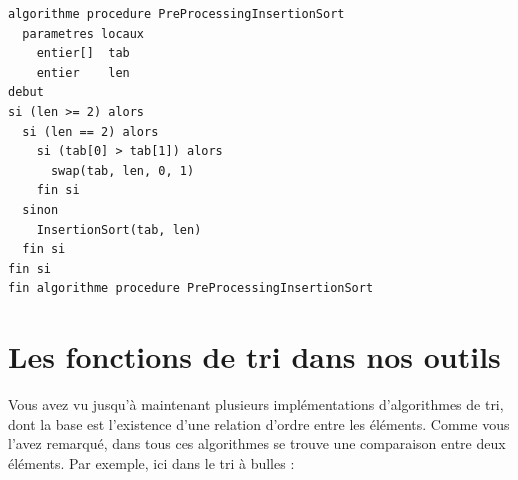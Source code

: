 \documentclass[11pt,a4paper]{article}
\begin{document}
\bigskip

\begin{table}[ht!]
  \centering
\begin{lstlisting}[style=algorithmique]
algorithme procedure PreProcessingInsertionSort
  parametres locaux
    entier[]  tab
    entier    len
debut
si (len >= 2) alors
  si (len == 2) alors
    si (tab[0] > tab[1]) alors
      swap(tab, len, 0, 1)
    fin si
  sinon
    InsertionSort(tab, len)
  fin si
fin si
fin algorithme procedure PreProcessingInsertionSort \end{lstlisting}
\end{table}


\clearpage


\section{Les fonctions de tri dans nos outils}

\medskip

Vous avez vu jusqu'à maintenant plusieurs implémentations d'algorithmes de tri, dont la base est l'existence d'une relation d'ordre entre les éléments.
Comme vous l'avez remarqué, dans tous ces algorithmes se trouve une comparaison entre deux éléments.
%
Par exemple, ici dans le tri à bulles :
\end{document}
